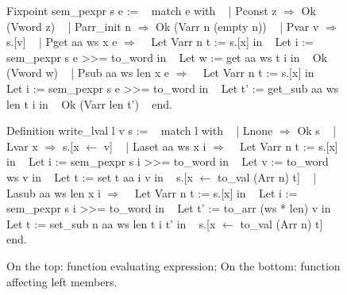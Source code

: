 \documentclass{article}
\begin{document}
\begin{figure}
\obeylines\obeyspaces\ttfamily%
Fixpoint sem\_pexpr s e :=
~ match e with
~ | Pconst z \(\Rightarrow\) Ok (Vword z)
~ | Parr\_init n \(\Rightarrow\) Ok (Varr n (empty n))
~ | Pvar v \(\Rightarrow\) s.[v]
~ | Pget aa ws x e \(\Rightarrow\)
~   Let Varr n t := s.[x] in
~   Let i := sem\_pexpr s e >{}>= to\_word in
~   Let w := get aa ws t i in
~   Ok (Vword w)
~ | Psub aa ws len x e \(\Rightarrow\)
~   Let Varr n t := s.[x] in
~   Let i := sem\_pexpr s e >{}>= to\_word in
~   Let t' := get\_sub aa ws len t i in
~   Ok (Varr len t')
~ end.

Definition write\_lval l v s :=
~ match l with
~ | Lnone \(\Rightarrow\) Ok s
~ | Lvar x \(\Rightarrow\) s.[x \(\leftarrow\) v]
~ | Laset aa ws x i \(\Rightarrow\)
~   Let Varr n t := s.[x] in
~   Let i := sem\_pexpr s i >{}>= to\_word in
~   Let v := to\_word ws v in
~   Let t := set t aa i v in
~   s.[x \(\leftarrow\) to\_val (Arr n) t]
~ | Lasub aa ws len x i \(\Rightarrow\)
~   Let Varr n t := s.[x] in
~   Let i := sem\_pexpr s i >{}>= to\_word in
~   Let t' := to\_arr (ws * len) v in 
~   Let t := set\_sub n aa ws len t i t' in
~   s.[x \(\leftarrow\) to\_val (Arr n) t]
~ end.
\normalfont%
\caption{On the top: function evaluating expression; %
On the bottom: function affecting left members.}
\end{figure}

\end{document}
